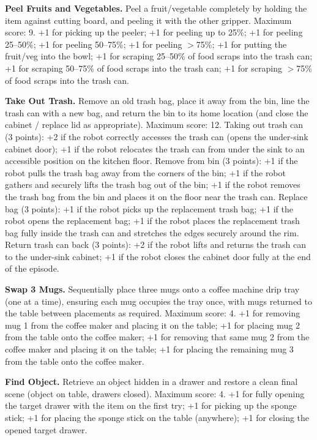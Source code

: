 \noindent \textbf{Peel Fruits and Vegetables.} Peel a fruit/vegetable completely by holding the item against cutting board, and peeling it with the other gripper.
Maximum score: 9. +1 for picking up the peeler; +1 for peeling up to 25\%; +1 for peeling 25–50\%; +1 for peeling 50–75\%; +1 for peeling $>$75\%; +1 for putting the fruit/veg into the bowl; +1 for scraping 25–50\% of food scraps into the trash can; +1 for scraping 50–75\% of food scraps into the trash can; +1 for scraping $>$75\% of food scraps into the trash can.

\noindent \textbf{Take Out Trash.} Remove an old trash bag, place it away from the bin, line the trash can with a new bag, and return the bin to its home location (and close the cabinet / replace lid as appropriate). Maximum score: 12. Taking out trash can (3 points): +2 if the robot correctly accesses the trash can (opens the under-sink cabinet door); +1 if the robot relocates the trash can from under the sink to an accessible position on the kitchen floor. Remove from bin (3 points): +1 if the robot pulls the trash bag away from the corners of the bin; +1 if the robot gathers and securely lifts the trash bag out of the bin; +1 if the robot removes the trash bag from the bin and places it on the floor near the trash can. Replace bag (3 points): +1 if the robot picks up the replacement trash bag; +1 if the robot opens the replacement bag; +1 if the robot places the replacement trash bag fully inside the trash can and stretches the edges securely around the rim. Return trash can back (3 points): +2 if the robot lifts and returns the trash can to the under-sink cabinet; +1 if the robot closes the cabinet door fully at the end of the episode.


\noindent \textbf{Swap 3 Mugs.} Sequentially place three mugs onto a coffee machine drip tray (one at a time), ensuring each mug occupies the tray once, with mugs returned to the table between placements as required. Maximum score: 4. +1 for removing mug 1 from the coffee maker and placing it on the table; +1 for placing mug 2 from the table onto the coffee maker; +1 for removing that same mug 2 from the coffee maker and placing it on the table; +1 for placing the remaining mug 3 from the table onto the coffee maker.

\noindent \textbf{Find Object.} Retrieve an object hidden in a drawer and restore a clean final scene (object on table, drawers closed).
Maximum score: 4. +1 for fully opening the target drawer with the item on the first try; +1 for picking up the sponge stick; +1 for placing the sponge stick on the table (anywhere); +1 for closing the opened target drawer.


